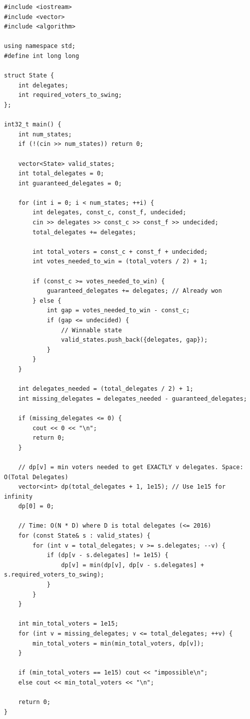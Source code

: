 \begin{lstlisting}
#include <iostream>
#include <vector>
#include <algorithm>

using namespace std;
#define int long long

struct State {
    int delegates;
    int required_voters_to_swing;
};

int32_t main() {
    int num_states;
    if (!(cin >> num_states)) return 0;
    
    vector<State> valid_states;
    int total_delegates = 0;
    int guaranteed_delegates = 0;
    
    for (int i = 0; i < num_states; ++i) {
        int delegates, const_c, const_f, undecided;
        cin >> delegates >> const_c >> const_f >> undecided;
        total_delegates += delegates;
        
        int total_voters = const_c + const_f + undecided;
        int votes_needed_to_win = (total_voters / 2) + 1;
        
        if (const_c >= votes_needed_to_win) {
            guaranteed_delegates += delegates; // Already won
        } else {
            int gap = votes_needed_to_win - const_c;
            if (gap <= undecided) {
                // Winnable state
                valid_states.push_back({delegates, gap});
            }
        }
    }
    
    int delegates_needed = (total_delegates / 2) + 1;
    int missing_delegates = delegates_needed - guaranteed_delegates;
    
    if (missing_delegates <= 0) {
        cout << 0 << "\n";
        return 0;
    }
    
    // dp[v] = min voters needed to get EXACTLY v delegates. Space: O(Total Delegates)
    vector<int> dp(total_delegates + 1, 1e15); // Use 1e15 for infinity
    dp[0] = 0;
    
    // Time: O(N * D) where D is total delegates (<= 2016)
    for (const State& s : valid_states) {
        for (int v = total_delegates; v >= s.delegates; --v) {
            if (dp[v - s.delegates] != 1e15) {
                dp[v] = min(dp[v], dp[v - s.delegates] + s.required_voters_to_swing);
            }
        }
    }
    
    int min_total_voters = 1e15;
    for (int v = missing_delegates; v <= total_delegates; ++v) {
        min_total_voters = min(min_total_voters, dp[v]);
    }
    
    if (min_total_voters == 1e15) cout << "impossible\n";
    else cout << min_total_voters << "\n";
    
    return 0;
}
\end{lstlisting}



